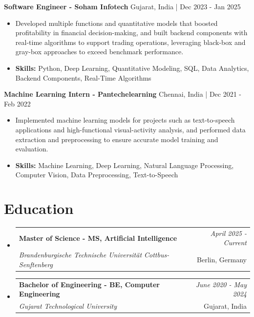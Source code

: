 \documentclass[a4paper,11pt]{article}
\makeatletter
\newcommand{\resumeSubheading}[4]{
\vspace{0.5mm}\item
    \begin{tabular*}{\linewidth}[t]{l@{\extracolsep{\fill}}r}
        \textbf{#1} & \textit{\footnotesize{#4}} \\
        \textit{\footnotesize{#3}} &  \footnotesize{#2}\\
    \end{tabular*}
    \vspace{-2.4mm}
}
\makeatother
\begin{document}
\vspace{1mm}
  \textbf{Software Engineer - Soham Infotech} \hfill Gujarat, India | Dec 2023 - Jan 2025
\vspace{-1.5mm} %
\begin{itemize}
  \item Developed multiple functions and quantitative models that boosted profitability in financial decision-making, and built backend components with real-time algorithms to support trading operations, leveraging black-box and gray-box approaches to exceed benchmark performance.

\vspace{-2mm}
  \item \textbf{Skills:} Python, Deep Learning, Quantitative Modeling, SQL, Data Analytics, Backend Components, Real-Time Algorithms
\end{itemize}

\vspace{1mm}
  \textbf{Machine Learning Intern - Pantechelearning} \hfill Chennai, India | Dec 2021 - Feb 2022
\vspace{-1.5mm} %
\begin{itemize}
  \item Implemented machine learning models for projects such as text-to-speech applications and high-functional visual-activity analysis, and performed data extraction and preprocessing to ensure accurate model training and evaluation.
\vspace{-2mm}
  \item \textbf{Skills:} Machine Learning, Deep Learning, Natural Language Processing, Computer Vision, Data Preprocessing, Text-to-Speech
\end{itemize}\section{\textbf{Education}}
\vspace{-0.4mm}

\begin{itemize}[leftmargin=0.15in, label={}]
\resumeSubheading
{Master of Science - MS, Artificial Intelligence }{Berlin, Germany}
{Brandenburgische Technische Universität Cottbus-Senftenberg  }{April 2025 - Current}

\vspace{1.0mm} %
\resumeSubheading
{Bachelor of Engineering - BE, Computer Engineering  }{Gujarat, India}
{Gujarat Technological University }{June 2020 - May 2024}

\end{itemize}
\end{document}
